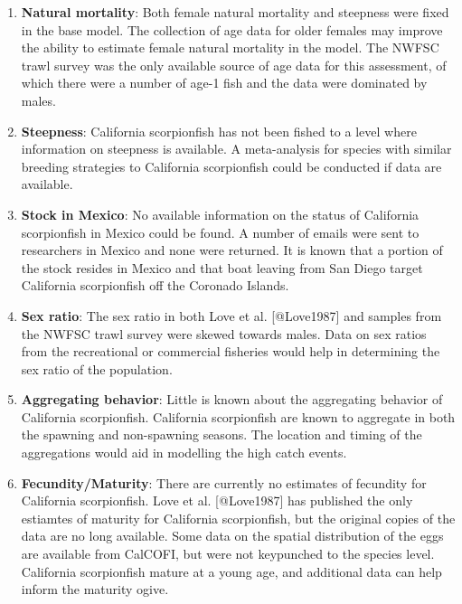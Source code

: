 \documentclass[12pt,]{article}
\begin{document}
\begin{enumerate}

\item \textbf{Natural mortality}: Both female natural mortality and steepness were 
fixed in the base model.  The collection of age data for older females may improve 
the ability to estimate female natural mortality in the model.  The NWFSC trawl survey
was the only available source of age data for this assessment, of which there were a 
number of age-1 fish and the data were dominated by males.

\item \textbf{Steepness}: California scorpionfish has not been fished to a level where information 
on steepness is available.  A meta-analysis for species with similar breeding strategies to 
California scorpionfish could be conducted if data are available.

\item \textbf{Stock in Mexico}:  No available information on the status of California 
scorpionfish in Mexico could be found.  A number of emails were sent to researchers 
in Mexico and none were returned.  It is known that a portion of the stock resides 
in Mexico and that boat leaving from San Diego target California scorpionfish off 
the Coronado Islands.  

\item \textbf{Sex ratio}:  The sex ratio in both Love et al. [@Love1987] and samples 
from the NWFSC trawl survey were skewed towards males. Data on sex ratios from the 
recreational or commercial fisheries would help in determining the sex ratio of the population.

\item \textbf{Aggregating behavior}: Little is known about the aggregating behavior
of California scorpionfish.  California scorpionfish are known to aggregate in both
the spawning and non-spawning seasons.  The location and timing of the aggregations
would aid in modelling the high catch events.

\item \textbf{Fecundity/Maturity}: There are currently no estimates of fecundity for California 
scorpionfish.  Love et al. [@Love1987] has published the only estiamtes of maturity for California 
scorpionfish, but the original copies of the data are no long available.  Some data on the spatial distribution of the eggs are available from CalCOFI, but were not keypunched to the species level. 
California scorpionfish mature at a young age, and additional data can help inform the maturity 
ogive.

\end{enumerate}
\end{document}
